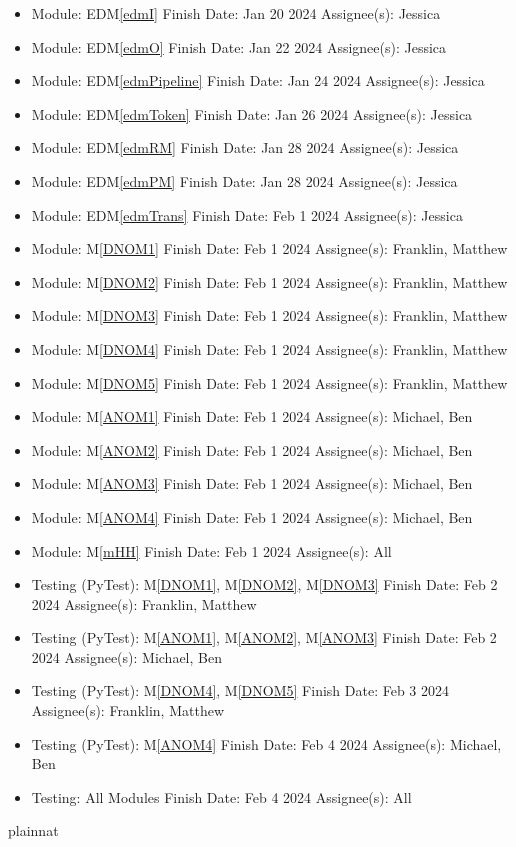 \documentclass[12pt, titlepage]{article}
\newcommand{\mref}[1]{M\ref{#1}}
\newcommand{\edmref}[1]{EDM\ref{#1}}
\begin{document}
\begin{itemize}
    \item Module: \edmref{edmI} Finish Date: Jan 20 2024 Assignee(s): Jessica
    \item Module: \edmref{edmO} Finish Date: Jan 22 2024 Assignee(s): Jessica
    \item Module: \edmref{edmPipeline} Finish Date: Jan 24 2024 Assignee(s): Jessica
    \item Module: \edmref{edmToken} Finish Date: Jan 26 2024 Assignee(s): Jessica
    \item Module: \edmref{edmRM} Finish Date: Jan 28 2024 Assignee(s): Jessica
    \item Module: \edmref{edmPM} Finish Date: Jan 28 2024 Assignee(s): Jessica
    \item Module: \edmref{edmTrans} Finish Date: Feb 1 2024 Assignee(s): Jessica
    \item Module: \mref{DNOM1} Finish Date: Feb 1 2024 Assignee(s): Franklin, Matthew
    \item Module: \mref{DNOM2} Finish Date: Feb 1 2024 Assignee(s): Franklin, Matthew
    \item Module: \mref{DNOM3} Finish Date: Feb 1 2024 Assignee(s): Franklin, Matthew
    \item Module: \mref{DNOM4} Finish Date: Feb 1 2024 Assignee(s): Franklin, Matthew
    \item Module: \mref{DNOM5} Finish Date: Feb 1 2024 Assignee(s): Franklin, Matthew
    \item Module: \mref{ANOM1} Finish Date: Feb 1 2024 Assignee(s): Michael, Ben
    \item Module: \mref{ANOM2} Finish Date: Feb 1 2024 Assignee(s): Michael, Ben
    \item Module: \mref{ANOM3} Finish Date: Feb 1 2024 Assignee(s): Michael, Ben
    \item Module: \mref{ANOM4} Finish Date: Feb 1 2024 Assignee(s): Michael, Ben
    \item Module: \mref{mHH} Finish Date: Feb 1 2024 Assignee(s): All
    \item Testing (PyTest): \mref{DNOM1}, \mref{DNOM2}, \mref{DNOM3} Finish Date: Feb 2 2024 Assignee(s): Franklin, Matthew
    \item Testing (PyTest): \mref{ANOM1}, \mref{ANOM2}, \mref{ANOM3} Finish Date: Feb 2 2024 Assignee(s): Michael, Ben
    \item Testing (PyTest): \mref{DNOM4}, \mref{DNOM5} Finish Date: Feb 3 2024 Assignee(s): Franklin, Matthew
    \item Testing (PyTest): \mref{ANOM4} Finish Date: Feb 4 2024 Assignee(s): Michael, Ben
    \item Testing: All Modules Finish Date: Feb 4 2024 Assignee(s): All
\end{itemize}


 {plainnat}


\newpage{}
\end{document}
